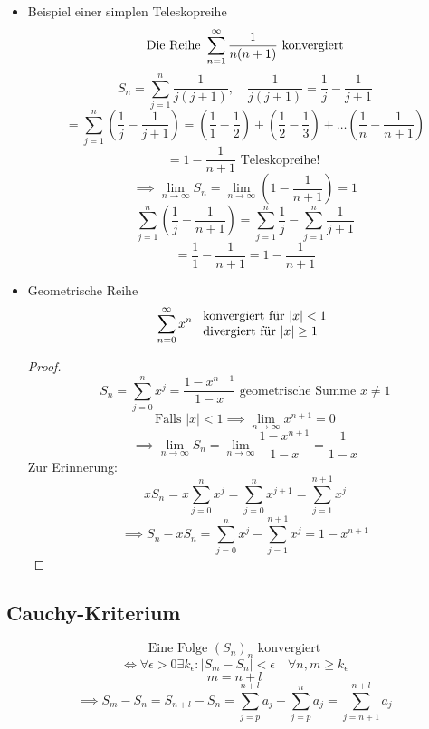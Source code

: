 \begin{example}

  \begin{itemize}
    \item Beispiel einer simplen Teleskopreihe
      \[\text{Die Reihe } \sum_{n=1}^{\infty} \frac{1}{n(n+1)} \text{ konvergiert}\]
      \[S_n = \sum_{j=1}^n \frac{1}{j(j+1)}, \quad \frac{1}{j(j+1)} = \frac{1}{j}-\frac{1}{j+1}\]
      \[= \sum_{j=1}^n \left( \frac{1}{j}-\frac{1}{j+1} \right) = \left( \frac{1}{1}-\frac{1}{2} \right) + \left( \frac{1}{2}-\frac{1}{3} \right) + \ldots \left( \frac{1}{n}-\frac{1}{n+1} \right) \]   
      \[= 1 - \frac{1}{n+1} \text{ Teleskopreihe! }\]
      \[\implies \lim_{n \to \infty} S_n = \lim_{n\to \infty} \left(1- \frac{1}{n+1} \right) =1\]
      \[\sum_{j=1}^n \left( \frac{1}{j} - \frac{1}{n+1} \right)  = \sum_{j=1}^n \frac{1}{j} - \sum_{j=1}^n \frac{1}{j+1}\]
      \[= \frac{1}{1} - \frac{1}{n+1} = 1-\frac{1}{n+1}\]
    \item Geometrische Reihe 
     \[ \sum_{n=0}^{\infty} x^n
       \begin{array}{l}
         \text{ konvergiert für } |x| < 1 \\
         \text{ divergiert für } |x| \geq 1   
       \end{array}       
     \]
     
     \begin{proof}
       \[S_n = \sum_{j=0}^n x^j = \frac{1-x^{n+1}}{1-x} \text{ geometrische Summe } x \neq 1\]
       \[\text{Falls } |x|<1 \implies \lim_{n\to \infty} x^{n+1} = 0 \]
       \[\implies \lim_{n \to \infty} S_n = \lim_{n \to \infty} \frac{1-x^{n+1}}{1-x}=\frac{1}{1-x}\]
       Zur Erinnerung:
       \[x S_n = x \sum_{j=0}^n x^j = \sum_{j=0}^n x^{j+1} = \sum_{j=1}^{n+1} x^{j}\]
       \[\implies S_n-x S_n = \sum_{j=0}^n x^j - \sum_{j=1}^{n+1} x^{j} = 1 - x^{n+1}\]
     \end{proof}
  \end{itemize}

\end{example}

\subsection{Cauchy-Kriterium}

\[\text{Eine Folge } (S_n)_n \text{ konvergiert} \]
\[\Longleftrightarrow \forall \epsilon > 0 \exists k_\epsilon : |S_m -S_n|<\epsilon \quad \forall n,m \geq k_\epsilon\] 
\[m=n+l\]
\[\implies S_m - S_n = S_{n+l} - S_n = \sum_{j=p}^{n+l} a_j -\sum_{j=p}^n a_j = \sum_{j=n+1}^{n+l} a_j\]

